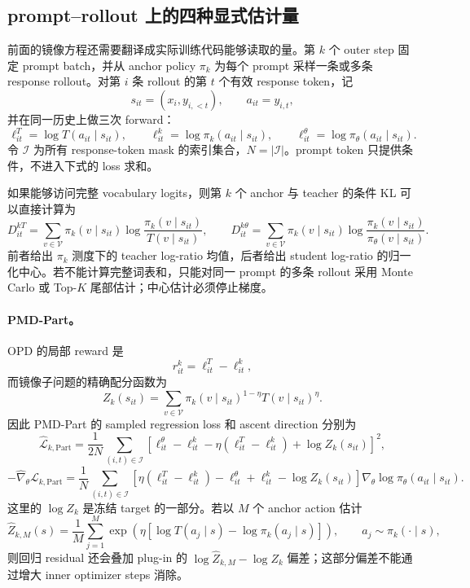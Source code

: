 \subsection{prompt--rollout 上的四种显式估计量}
\label{subsec:ch2-opd-explicit-inner}

前面的镜像方程还需要翻译成实际训练代码能够读取的量。第 $k$ 个 outer step 固定 prompt batch，并从 anchor policy $\pi_k$ 为每个 prompt 采样一条或多条 response rollout。对第 $i$ 条 rollout 的第 $t$ 个有效 response token，记
\[
 s_{it}=(x_i,y_{i,<t}),
 \qquad a_{it}=y_{i,t},
\]
并在同一历史上做三次 forward：
\begin{equation}
\label{eq:ch2-opd-three-logprobs}
 \ell^T_{it}=\log T(a_{it}\mid s_{it}),\qquad
 \ell^k_{it}=\log\pi_k(a_{it}\mid s_{it}),\qquad
 \ell^\theta_{it}=\log\pi_\theta(a_{it}\mid s_{it}).
\end{equation}
令 $\mathcal I$ 为所有 response-token mask 的索引集合，$N=|\mathcal I|$。prompt token 只提供条件，不进入下式的 loss 求和。

如果能够访问完整 vocabulary logits，则第 $k$ 个 anchor 与 teacher 的条件 KL 可以直接计算为
\begin{equation}
\label{eq:ch2-opd-full-kls}
 D^{kT}_{it}=\sum_{v\in\mathcal V}\pi_k(v\mid s_{it})
 \log\frac{\pi_k(v\mid s_{it})}{T(v\mid s_{it})},
 \qquad
 D^{k\theta}_{it}=\sum_{v\in\mathcal V}\pi_k(v\mid s_{it})
 \log\frac{\pi_k(v\mid s_{it})}{\pi_\theta(v\mid s_{it})}.
\end{equation}
前者给出 $\pi_k$ 测度下的 teacher log-ratio 均值，后者给出 student log-ratio 的归一化中心。若不能计算完整词表和，只能对同一 prompt 的多条 rollout 采用 Monte Carlo 或 Top-$K$ 尾部估计；中心估计必须停止梯度。

\paragraph*{PMD-Part。}
OPD 的局部 reward 是
\[
 r^k_{it}=\ell^T_{it}-\ell^k_{it},
\]
而镜像子问题的精确配分函数为
\[
 Z_k(s_{it})=\sum_{v\in\mathcal V}
 \pi_k(v\mid s_{it})^{1-\eta}T(v\mid s_{it})^\eta.
\]
因此 PMD-Part 的 sampled regression loss 和 ascent direction 分别为
\begin{equation}
\label{eq:ch2-opd-part-explicit-loss}
 \widehat{\mathcal L}_{k,\mathrm{Part}}
 =\frac1{2N}\sum_{(i,t)\in\mathcal I}
 \left[\ell^\theta_{it}-\ell^k_{it}
 -\eta(\ell^T_{it}-\ell^k_{it})
 +\log Z_k(s_{it})\right]^2,
\end{equation}
\begin{equation}
\label{eq:ch2-opd-part-explicit-gradient}
 -\widehat\nabla_\theta\mathcal L_{k,\mathrm{Part}}
 =\frac1N\sum_{(i,t)\in\mathcal I}
 \left[\eta(\ell^T_{it}-\ell^k_{it})-\ell^\theta_{it}+\ell^k_{it}
 -\log Z_k(s_{it})\right]
 \nabla_\theta\log\pi_\theta(a_{it}\mid s_{it}).
\end{equation}
这里的 $\log Z_k$ 是冻结 target 的一部分。若以 $M$ 个 anchor action 估计
\[
 \widehat Z_{k,M}(s)=\frac1M\sum_{j=1}^M
 \exp\!\left(\eta[\log T(a_j\mid s)-\log\pi_k(a_j\mid s)]\right),
 \qquad a_j\sim\pi_k(\cdot\mid s),
\]
则回归 residual 还会叠加 plug-in 的 $\log\widehat Z_{k,M}-\log Z_k$ 偏差；这部分偏差不能通过增大 inner optimizer steps 消除。

